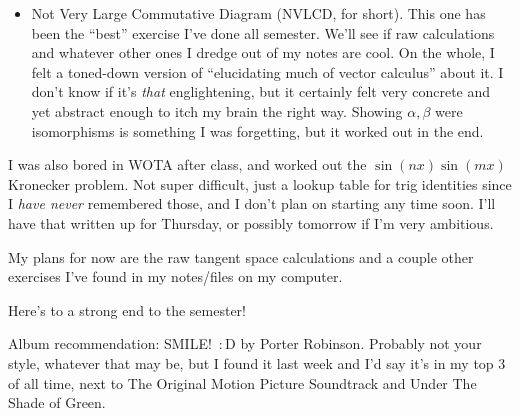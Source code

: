 \documentclass{article}
\begin{document}
\begin{itemize}
  \item Not Very Large Commutative Diagram (NVLCD, for short).
        This one has been the ``best'' exercise I've done all semester. We'll see if raw calculations and whatever other ones I dredge out of my notes are cool.
        On the whole, I felt a toned-down version of ``elucidating much of vector calculus'' about it. I don't know if it's \emph{that} englightening, but it certainly
        felt very concrete and yet abstract enough to itch my brain the right way.
        Showing $\alpha, \beta$ were isomorphisms is something I was forgetting, but it worked out in the end.
\end{itemize}

I was also bored in WOTA after class, and worked out the $\sin(nx)\sin(mx)$ Kronecker problem.
Not super difficult, just a lookup table for trig identities since I \emph{have never} remembered those, and I don't plan on starting any time soon.
I'll have that written up for Thursday, or possibly tomorrow if I'm very ambitious.

My plans for now are the raw tangent space calculations and a couple other exercises I've found in my notes/files on my computer.

Here's to a strong end to the semester!

Album recommendation: SMILE!\ $:$D by Porter Robinson.
Probably not your style, whatever that may be, but I found it last week and I'd say it's in my top 3 of all time,
next to The Original Motion Picture Soundtrack and Under The Shade of Green.
\end{document}
